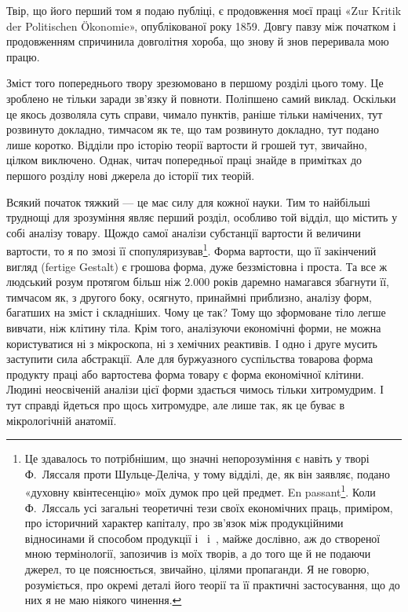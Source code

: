 
Твір, що його перший том я подаю публіці, є продовження
моєї праці «Zur Kritik der Politischen Ökonomie», опублікованої
року 1859. Довгу павзу між початком і продовженням спричинила
довголітня хороба, що знову й знов переривала мою працю.

Зміст того попереднього твору зрезюмовано в першому розділі
цього тому. Це зроблено не тільки заради зв’язку й повноти. Поліпшено
самий виклад. Оскільки це якось дозволяла суть справи,
чимало пунктів, раніше тільки намічених, тут розвинуто докладно,
тимчасом як те, що там розвинуто докладно, тут подано лише
коротко. Відділи про історію теорії вартости й грошей тут,
звичайно, цілком виключено. Однак, читач попередньої праці
знайде в примітках до першого розділу нові джерела до історії
тих теорій.

Всякий початок тяжкий — це має силу для кожної науки.
Тим то найбільші труднощі для зрозуміння являє перший розділ,
особливо той відділ, що містить у собі аналізу товару. Щождо
самої аналізи субстанції вартости й величини вартости, то я по
змозі її спопуляризував\footnote{
Це здавалось то потрібнішим, що значні непорозуміння є навіть
у творі Ф.~Ляссаля проти Шульце-Деліча, у тому відділі, де, як він
заявляє, подано «духовну квінтесенцію» моїх думок про цей предмет.
En passant\footnote*{
— між іншим. \emph{Ред.}
}. Коли Ф.~Ляссаль усі загальні теоретичні тези своїх економічних
праць, приміром, про історичний характер капіталу, про зв’язок
між продукційними відносинами й способом продукції і~ і~,
майже дослівно, аж до створеної мною термінології, запозичив із моїх
творів, а до того ще й не подаючи джерел, то це пояснюється, звичайно,
цілями пропаганди. Я не говорю, розуміється, про окремі деталі його
теорії та її практичні застосування, що до них я не маю ніякого чинення.
}. Форма вартости, що її закінчений
вигляд (fertige Gestalt) є грошова форма, дуже беззмістовна і
проста. Та все ж людський розум протягом більш ніж \num{2.000} років
даремно намагався збагнути її, тимчасом як, з другого боку, осягнуто,
принаймні приблизно, аналізу форм, багатших на зміст і
складніших. Чому це так? Тому що зформоване тіло легше вивчати,
ніж клітину тіла. Крім того, аналізуючи економічні
форми, не можна користуватися ні з мікроскопа, ні з хемічних
реактивів. І одно і друге мусить заступити сила абстракції. Але
для буржуазного суспільства товарова форма продукту праці або
вартостева форма товару є форма економічної клітини. Людині
неосвіченій аналізи цієї форми здається чимось тільки хитромудрим.
І тут справді йдеться про щось хитромудре, але лише
так, як це буває в мікрологічній анатомії.
